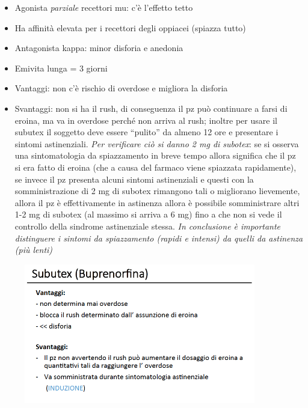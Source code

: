 \begin{itemize}
\item
  Agonista \emph{parziale} recettori mu: c'è l'effetto tetto
\item
  Ha affinità elevata per i recettori degli oppiacei (spiazza tutto)
\item
  Antagonista kappa: minor disforia e anedonia
\item
  Emivita lunga = 3 giorni
\item
  Vantaggi: non c'è rischio di overdose e migliora la disforia
\item
  Svantaggi: non si ha il rush, di conseguenza il pz può continuare a
  farsi di eroina, ma va in overdose perché non arriva al rush; inoltre
  per usare il subutex il soggetto deve essere ``pulito'' da almeno 12
  ore e presentare i sintomi astinenziali. \emph{Per verificare ciò si
  danno 2 mg di subotex}: se si osserva una sintomatologia da
  spiazzamento in breve tempo allora significa che il pz si era fatto di
  eroina (che a causa del farmaco viene spiazzata rapidamente), se
  invece il pz presenta alcuni sintomi astinenziali e questi con la
  somministrazione di 2 mg di subotex rimangono tali o migliorano
  lievemente, allora il pz è effettivamente in astinenza allora è
  possibile somministrare altri 1-2 mg di subotex (al massimo si arriva
  a 6 mg) fino a che non si vede il controllo della sindrome
  astinenziale stessa. \emph{In conclusione è importante distinguere i
  sintomi da spiazzamento (rapidi e intensi) da quelli da astinenza (più
  lenti)}
  
\end{itemize}

\begin{figure}[!ht]
\centering
	\includegraphics[width=0.9\textwidth]{017/image16.png}
\end{figure}

